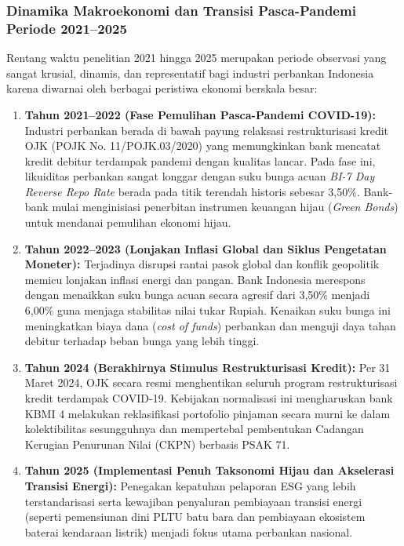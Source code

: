 \documentclass[12pt,a4paper]{article}
\numberwithin{equation}{section}
\begin{document}
\subsubsection*{Dinamika Makroekonomi dan Transisi Pasca-Pandemi Periode 2021--2025}
\noindent
Rentang waktu penelitian 2021 hingga 2025 merupakan periode observasi yang sangat krusial, dinamis, dan representatif bagi industri perbankan Indonesia karena diwarnai oleh berbagai peristiwa ekonomi berskala besar:
\begin{enumerate}
  \item \textbf{Tahun 2021--2022 (Fase Pemulihan Pasca-Pandemi COVID-19):} Industri perbankan berada di bawah payung relaksasi restrukturisasi kredit OJK (POJK No. 11/POJK.03/2020) yang memungkinkan bank mencatat kredit debitur terdampak pandemi dengan kualitas lancar. Pada fase ini, likuiditas perbankan sangat longgar dengan suku bunga acuan \emph{BI-7 Day Reverse Repo Rate} berada pada titik terendah historis sebesar 3,50\%. Bank-bank mulai menginisiasi penerbitan instrumen keuangan hijau (\emph{Green Bonds}) untuk mendanai pemulihan ekonomi hijau.
  \item \textbf{Tahun 2022--2023 (Lonjakan Inflasi Global dan Siklus Pengetatan Moneter):} Terjadinya disrupsi rantai pasok global dan konflik geopolitik memicu lonjakan inflasi energi dan pangan. Bank Indonesia merespons dengan menaikkan suku bunga acuan secara agresif dari 3,50\% menjadi 6,00\% guna menjaga stabilitas nilai tukar Rupiah. Kenaikan suku bunga ini meningkatkan biaya dana (\emph{cost of funds}) perbankan dan menguji daya tahan debitur terhadap beban bunga yang lebih tinggi.
  \item \textbf{Tahun 2024 (Berakhirnya Stimulus Restrukturisasi Kredit):} Per 31 Maret 2024, OJK secara resmi menghentikan seluruh program restrukturisasi kredit terdampak COVID-19. Kebijakan normalisasi ini mengharuskan bank KBMI 4 melakukan reklasifikasi portofolio pinjaman secara murni ke dalam kolektibilitas sesungguhnya dan mempertebal pembentukan Cadangan Kerugian Penurunan Nilai (CKPN) berbasis PSAK 71.
  \item \textbf{Tahun 2025 (Implementasi Penuh Taksonomi Hijau dan Akselerasi Transisi Energi):} Penegakan kepatuhan pelaporan ESG yang lebih terstandarisasi serta kewajiban penyaluran pembiayaan transisi energi (seperti pemensiunan dini PLTU batu bara dan pembiayaan ekosistem baterai kendaraan listrik) menjadi fokus utama perbankan nasional.
\end{enumerate}
\end{document}
